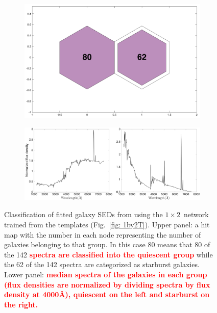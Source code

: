             \begin{figure}
                \begin{subfigure}[b]{0.45\textwidth}
                    \centering
                    \includegraphics[width=\textwidth]{images0.01/1d/hit_v_1_by_2.png}
                \end{subfigure}
                \hfill
                \begin{subfigure}[b]{0.45\textwidth}
                     \includegraphics[width=\textwidth]{images0.01/1d/SED_total1by2_fluxdensity.png}
                \end{subfigure}
                \caption{Classification of fitted galaxy SEDs from \citet{Hossein12} using the $1\times2$~network trained from the \citet{Kinney96} templates (Fig.~\ref{fig: 1by2T}). Upper panel: a hit map with the number in each node representing the number of galaxies belonging to that group. In this case 80 means that 80 of the 142 \textbf{\textcolor{red}{spectra are classified into the quiescent group}} while the 62 of the 142 spectra are categorized as starburst galaxies. Lower panel: \textbf{\textcolor{red}{median spectra of the galaxies in each group (flux densities are normalized by dividing spectra by flux density at 4000\AA), quiescent on the left and starburst on the right.}}}
                \label{fig: 1by2V}
            \end{figure}          
            
